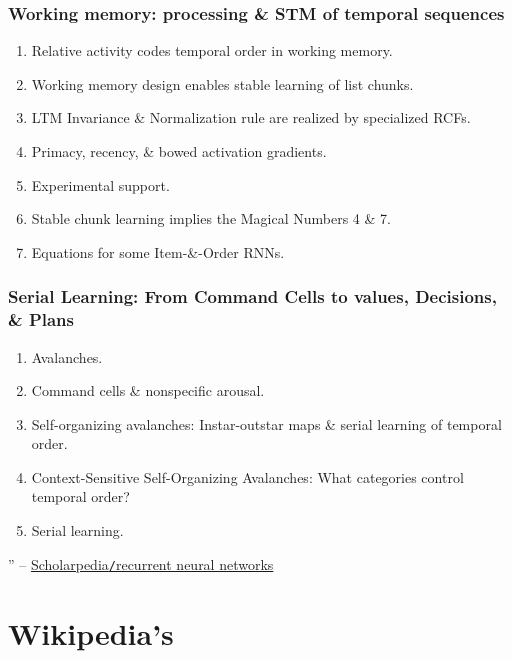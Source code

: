 \documentclass{article}
\begin{document}
\subsubsection{Working memory: processing \& STM of temporal sequences}

\begin{enumerate}
	\item {\sf Relative activity codes temporal order in working memory.}
	\item {\sf Working memory design enables stable learning of list chunks.}
	\item {\sf LTM Invariance \& Normalization rule are realized by specialized RCFs.}
	\item {\sf Primacy, recency, \& bowed activation gradients.}
	\item {\sf Experimental support.}
	\item {\sf Stable chunk learning implies the Magical Numbers 4 \& 7.}
	\item {\sf Equations for some Item-\&-Order RNNs.}
\end{enumerate}

\subsubsection{Serial Learning: From Command Cells to values, Decisions, \& Plans}

\begin{enumerate}
	\item {\sf Avalanches.}
	\item {\sf Command cells \& nonspecific arousal.}
	\item {\sf Self-organizing avalanches: Instar-outstar maps \& serial learning of temporal order.}
	\item {\sf Context-Sensitive Self-Organizing Avalanches: What categories control temporal order?}
	\item {\sf Serial learning.}
\end{enumerate}

'' -- \href{http://www.scholarpedia.org/article/Recurrent_neural_networks}{Scholarpedia{\tt/}recurrent neural networks}


\section{Wikipedia's}
\end{document}
